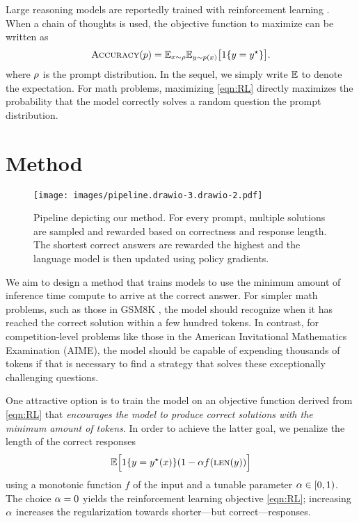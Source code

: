 Large reasoning models \cite{guo2025deepseek}
are reportedly trained with reinforcement learning \cite{sutton2018reinforcement}.
When a chain of thoughts is used, 
the objective function to maximize can be written as
\begin{equation}
\label{eqn:RL}
	\textsc{Accuracy}(p) = \mathbb E_{x \sim \rho} \mathbb E_{y \sim p(x{})} \big[ {1}\{ y = y^\star \} \big].
\end{equation}
where  $\rho$ is the prompt distribution.
% 
In the sequel, we simply write $\mathbb E$
to denote the expectation.
For math problems, maximizing \cref{eqn:RL} directly  
maximizes the probability that the model correctly solves a random question the prompt distribution.

\section{Method}

\begin{figure*}[h!]
\centering
  \texttt{[image: images/pipeline.drawio-3.drawio-2.pdf]}
  
  \caption{Pipeline depicting our method. For every prompt, multiple solutions are sampled and rewarded based on correctness and response length. The shortest correct answers are rewarded the highest and the language model is then updated using policy gradients.}
  \label{fig:main_pipeline}
\end{figure*}


We aim to design a method that trains models to use the minimum amount of inference time compute to arrive at the correct answer.
For simpler math problems, such as those in GSM8K \cite{cobbe2021training}, the model should recognize when it has reached the correct solution within a few hundred tokens. In contrast, for competition-level problems like those in the American Invitational Mathematics Examination (AIME), the model should be capable of expending thousands of tokens if that is necessary to find a strategy that solves these exceptionally challenging questions.

One attractive option is to train the model on an objective function derived from \cref{eqn:RL} that \emph{encourages the model to produce correct solutions with the minimum amount of tokens}.
In order to achieve the latter goal, we  penalize the length 
of  the correct responses
\begin{equation}
\label{eqn:lenpen}
    	\mathbb E\Big[ 
        {1}\{y = y^\star(x{}) \}
	( 1 - \alpha f(\textsc{len}(y) ) \Big]
\end{equation}
using a monotonic function $f$ of the input and a tunable parameter $\alpha \in [0, 1)$.
The choice $\alpha = 0$ yields the
reinforcement learning objective \eqref{eqn:RL}; increasing $\alpha$ increases the regularization towards shorter---but correct---responses.

